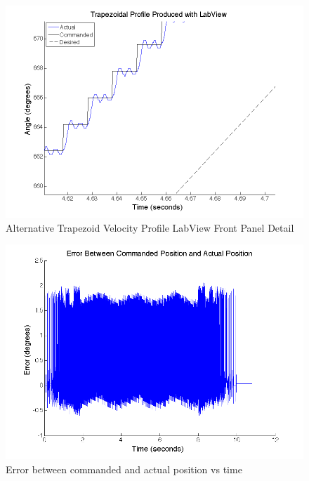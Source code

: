 \documentclass{article}
\theoremstyle{plain}
\theoremstyle{definition}
\theoremstyle{remark}
\begin{document}
\begin{figure}
\begin{center}
\includegraphics[width = 12cm]{labViewProfile_Detail1.png}
\caption{Alternative Trapezoid Velocity Profile LabView Front Panel Detail}
\label{Q4a_Alt5}
\end{center}
\end{figure}

\begin{figure}
\begin{center}
\includegraphics[width = 12cm]{labViewCommandError.png}
\caption{Error between commanded and actual position vs time}
\label{Q4a_Alt6}
\end{center}
\end{figure}
\end{document}
